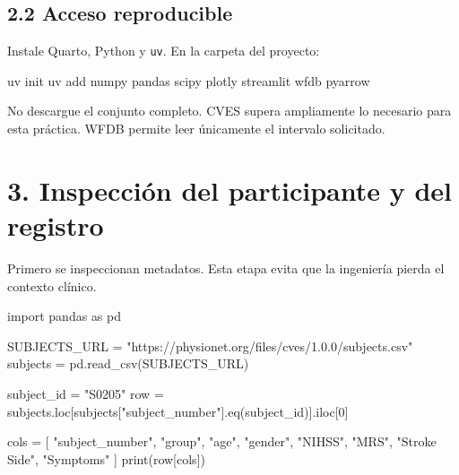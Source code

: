 \documentclass[
  spanish,
  a4paper,
  DIV=11,
  numbers=noendperiod]{scrreprt}
\newenvironment{Shaded}{\begin{snugshade}}{\end{snugshade}}
\newcommand{\BuiltInTok}[1]{\textcolor[rgb]{0.00,0.23,0.31}{#1}}
\newcommand{\DecValTok}[1]{\textcolor[rgb]{0.68,0.00,0.00}{#1}}
\newcommand{\ExtensionTok}[1]{\textcolor[rgb]{0.00,0.23,0.31}{#1}}
\newcommand{\ImportTok}[1]{\textcolor[rgb]{0.00,0.46,0.62}{#1}}
\newcommand{\NormalTok}[1]{\textcolor[rgb]{0.00,0.23,0.31}{#1}}
\newcommand{\OperatorTok}[1]{\textcolor[rgb]{0.37,0.37,0.37}{#1}}
\newcommand{\StringTok}[1]{\textcolor[rgb]{0.13,0.47,0.30}{#1}}
\begin{document}
\section{2.2 Acceso reproducible}\label{acceso-reproducible}

Instale Quarto, Python y \texttt{uv}. En la carpeta del proyecto:

\begin{Shaded}
\begin{Highlighting}[]
\ExtensionTok{uv}\NormalTok{ init}
\ExtensionTok{uv}\NormalTok{ add numpy pandas scipy plotly streamlit wfdb pyarrow}
\end{Highlighting}
\end{Shaded}

No descargue el conjunto completo. CVES supera ampliamente lo necesario
para esta práctica. WFDB permite leer únicamente el intervalo
solicitado.

\chapter{3. Inspección del participante y del
registro}\label{inspecciuxf3n-del-participante-y-del-registro}

Primero se inspeccionan metadatos. Esta etapa evita que la ingeniería
pierda el contexto clínico.

\begin{Shaded}
\begin{Highlighting}[]
\ImportTok{import}\NormalTok{ pandas }\ImportTok{as}\NormalTok{ pd}

\NormalTok{SUBJECTS\_URL }\OperatorTok{=} \StringTok{"https://physionet.org/files/cves/1.0.0/subjects.csv"}
\NormalTok{subjects }\OperatorTok{=}\NormalTok{ pd.read\_csv(SUBJECTS\_URL)}

\NormalTok{subject\_id }\OperatorTok{=} \StringTok{"S0205"}
\NormalTok{row }\OperatorTok{=}\NormalTok{ subjects.loc[subjects[}\StringTok{"subject\_number"}\NormalTok{].eq(subject\_id)].iloc[}\DecValTok{0}\NormalTok{]}

\NormalTok{cols }\OperatorTok{=}\NormalTok{ [}
    \StringTok{"subject\_number"}\NormalTok{, }\StringTok{"group"}\NormalTok{, }\StringTok{"age"}\NormalTok{, }\StringTok{"gender"}\NormalTok{,}
    \StringTok{"NIHSS"}\NormalTok{, }\StringTok{"MRS"}\NormalTok{, }\StringTok{"Stroke Side"}\NormalTok{, }\StringTok{"Symptoms"}
\NormalTok{]}
\BuiltInTok{print}\NormalTok{(row[cols])}
\end{Highlighting}
\end{Shaded}
\end{document}
